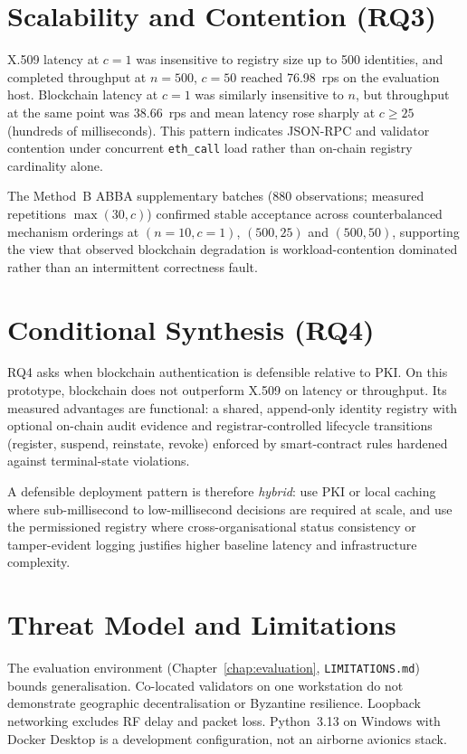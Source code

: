 \section{Scalability and Contention (RQ3)}
\label{sec:disc-rq3}

X.509 latency at $c=1$ was insensitive to registry size up to 500 identities, and completed throughput at $n=500$, $c=50$ reached 76.98~rps on the evaluation host. Blockchain latency at $c=1$ was similarly insensitive to $n$, but throughput at the same point was 38.66~rps and mean latency rose sharply at $c \geq 25$ (hundreds of milliseconds). This pattern indicates JSON-RPC and validator contention under concurrent \texttt{eth\_call} load rather than on-chain registry cardinality alone.

The Method~B ABBA supplementary batches (880 observations; measured repetitions $\max(30,c)$) confirmed stable acceptance across counterbalanced mechanism orderings at $(n{=}10,c{=}1)$, $(500,25)$ and $(500,50)$, supporting the view that observed blockchain degradation is workload-contention dominated rather than an intermittent correctness fault.

\section{Conditional Synthesis (RQ4)}
\label{sec:disc-rq4}

RQ4 asks when blockchain authentication is defensible relative to PKI. On this prototype, blockchain does not outperform X.509 on latency or throughput. Its measured advantages are functional: a shared, append-only identity registry with optional on-chain audit evidence and registrar-controlled lifecycle transitions (register, suspend, reinstate, revoke) enforced by smart-contract rules hardened against terminal-state violations.

A defensible deployment pattern is therefore \emph{hybrid}: use PKI or local caching where sub-millisecond to low-millisecond decisions are required at scale, and use the permissioned registry where cross-organisational status consistency or tamper-evident logging justifies higher baseline latency and infrastructure complexity.

\section{Threat Model and Limitations}
\label{sec:disc-limitations}

The evaluation environment (Chapter~\ref{chap:evaluation}, \texttt{LIMITATIONS.md}) bounds generalisation. Co-located validators on one workstation do not demonstrate geographic decentralisation or Byzantine resilience. Loopback networking excludes RF delay and packet loss. Python~3.13 on Windows with Docker Desktop is a development configuration, not an airborne avionics stack.

